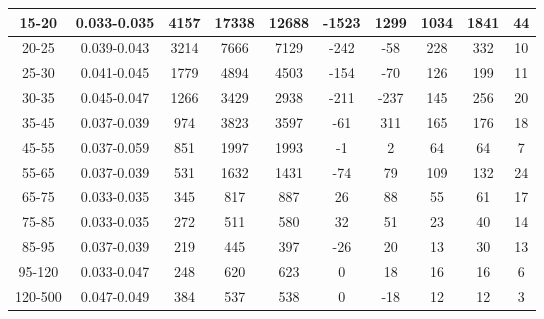 \documentclass{beamer}
\begin{document}
\begin{frame}
\begin{table}[h]
\begin{center}
\begin{tabular}{|c|c|c|c|c|c|c|c|c|c|}
    15-20 & 0.033-0.035 & 4157 & 17338 & 12688 & -1523 & 1299 & 1034 & 1841 & 44  \\ \hline
    20-25 & 0.039-0.043 & 3214 & 7666 & 7129 & -242 & -58 & 228 & 332 & 10  \\ \hline
    25-30 & 0.041-0.045 & 1779 & 4894 & 4503 & -154 & -70 & 126 & 199 & 11  \\ \hline
    30-35 & 0.045-0.047 & 1266 & 3429 & 2938 & -211 & -237 & 145 & 256 & 20  \\ \hline
    35-45 & 0.037-0.039 & 974 & 3823 & 3597 & -61 & 311 & 165 & 176 & 18  \\ \hline
    45-55 & 0.037-0.059 & 851 & 1997 & 1993 & -1 & 2 & 64 & 64 & 7  \\ \hline
    55-65 & 0.037-0.039 & 531 & 1632 & 1431 & -74 & 79 & 109 & 132 & 24  \\ \hline
    65-75 & 0.033-0.035 & 345 & 817 & 887 & 26 & 88 & 55 & 61 & 17  \\ \hline
    75-85 & 0.033-0.035 & 272 & 511 & 580 & 32 & 51 & 23 & 40 & 14  \\ \hline
    85-95 & 0.037-0.039 & 219 & 445 & 397 & -26 & 20 & 13 & 30 & 13  \\ \hline
    95-120 & 0.033-0.047 & 248 & 620 & 623 & 0 & 18 & 16 & 16 & 6  \\ \hline
    120-500 & 0.047-0.049 & 384 & 537 & 538 & 0 & -18 & 12 & 12 & 3  \\ \hline
  \end{tabular}
  \label{tab:systSbVar_Meth1_ELECTRON_WGamma_Endcap}
  \end{center}
\end{table}
\end{frame}
\end{document}
